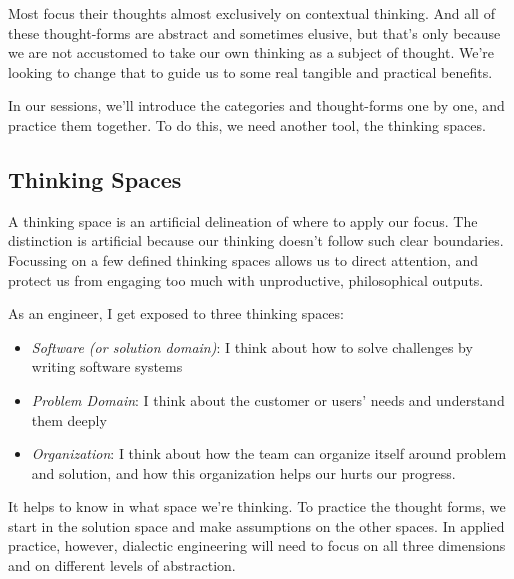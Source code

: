 Most focus their thoughts almost exclusively on contextual thinking.
And all of these thought-forms are abstract and sometimes elusive, but that's only because we are not accustomed to
take our own thinking as a subject of thought.
We're looking to change that to guide us to some real tangible and practical benefits.

In our sessions, we'll introduce the categories and thought-forms one by one, and practice them together.
To do this, we need another tool, the thinking spaces.

\subsection{Thinking Spaces}\label{subsec:Thinking Spaces}

A thinking space is an artificial delineation of where to apply our focus.
The distinction is artificial because our thinking doesn't follow such clear boundaries.
Focussing on a few defined thinking spaces allows us to direct attention, and protect us from engaging too much with
unproductive, philosophical outputs.

As an engineer, I get exposed to three thinking spaces:

\begin{itemize}
    \item \emph{Software (or solution domain)}: I think about how to solve challenges by writing software systems
    \item \emph{Problem Domain}: I think about the customer or users' needs and understand them deeply
    \item \emph{Organization}: I think about how the team can organize itself around problem and solution, and how
    this organization helps our hurts our progress.
\end{itemize}

It helps to know in what space we're thinking.
To practice the thought forms, we start in the solution space and make assumptions on the other spaces.
In applied practice, however, dialectic engineering will need to focus on all three dimensions and on different
levels of abstraction.